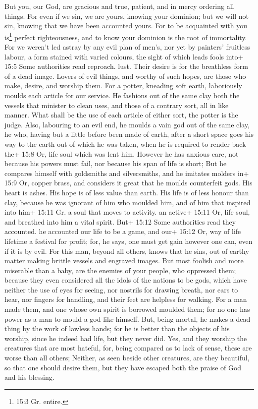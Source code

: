  But you, our God, are gracious and true, patient, and in
mercy ordering all things.  For even if we sin, we are
yours, knowing your dominion; but we will not sin, knowing that we have
been accounted yours.  For to be acquainted with you
is\footnote{15:3 Gr. entire.} perfect righteousness, and to know your
dominion is the root of immortality.  For we weren't led
astray by any evil plan of men's, nor yet by painters' fruitless labour,
a form stained with varied colours,  the sight of which
leads fools into+ 15:5 Some authorities read reproach. lust. Their
desire is for the breathless form of a dead image.  Lovers
of evil things, and worthy of such hopes, are those who make, desire,
and worship them.  For a potter, kneading soft earth,
laboriously moulds each article for our service. He fashions out of the
same clay both the vessels that minister to clean uses, and those of a
contrary sort, all in like manner. What shall be the use of each article
of either sort, the potter is the judge.  Also, labouring to
an evil end, he moulds a vain god out of the same clay, he who, having
but a little before been made of earth, after a short space goes his way
to the earth out of which he was taken, when he is required to render
back the+ 15:8 Or, life soul which was lent him.  However he
has anxious care, not because his powers must fail, nor because his span
of life is short; But he compares himself with goldsmiths and
silversmiths, and he imitates molders in+ 15:9 Or, copper brass, and
considers it great that he moulds counterfeit gods.  His
heart is ashes. His hope is of less value than earth. His life is of
less honour than clay,  because he was ignorant of him who
moulded him, and of him that inspired into him+ 15:11 Gr. a soul that
moves to activity. an active+ 15:11 Or, life soul, and breathed into him
a vital spirit.  But+ 15:12 Some authorities read they
accounted. he accounted our life to be a game, and our+ 15:12 Or, way of
life lifetime a festival for profit; for, he says, one must get gain
however one can, even if it is by evil.  For this man,
beyond all others, knows that he sins, out of earthy matter making
brittle vessels and engraved images.  But most foolish and
more miserable than a baby, are the enemies of your people, who
oppressed them;  because they even considered all the idols
of the nations to be gods, which have neither the use of eyes for
seeing, nor nostrils for drawing breath, nor ears to hear, nor fingers
for handling, and their feet are helpless for walking.  For
a man made them, and one whose own spirit is borrowed moulded them; for
no one has power as a man to mould a god like himself. 
But, being mortal, he makes a dead thing by the work of lawless hands;
for he is better than the objects of his worship, since he indeed had
life, but they never did.  Yes, and they worship the
creatures that are most hateful, for, being compared as to lack of
sense, these are worse than all others;  Neither, as seen
beside other creatures, are they beautiful, so that one should desire
them, but they have escaped both the praise of God and his blessing.

